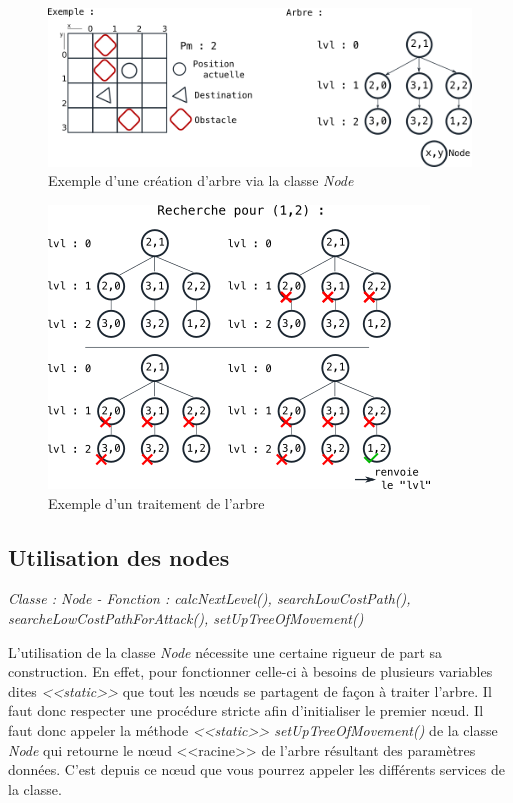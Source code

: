 \documentclass[a4paper, titlepage]{livret}
\begin{document}
          \begin{figure}[th]
          \begin{center}
            \includegraphics[scale=0.6]{Assets/treeExample.png}
            \caption{Exemple d'une création d'arbre via la classe \textit{Node}}
            \label{treeExample}
          \end{center}
        \end{figure}
            
        \begin{figure}[th]
          \begin{center}
            \includegraphics[scale=0.6]{Assets/parcourTree.png}
            \caption{Exemple d'un traitement de l'arbre}
            \label{parcourExample}
          \end{center}
        \end{figure}
        

      
        \subsection{Utilisation des nodes}
        \begin{center}
          \textit{Classe : Node - Fonction : calcNextLevel(), searchLowCostPath(), searcheLowCostPathForAttack(), setUpTreeOfMovement()}
        \end{center}
          L'utilisation de la classe \textit{Node} nécessite une certaine rigueur de part sa construction. En effet, pour fonctionner celle-ci à besoins de plusieurs variables dites \textit{<<static>>} que tout les nœuds se partagent de façon à traiter l'arbre. Il faut donc respecter une procédure stricte afin d'initialiser le premier nœud. Il faut donc appeler la méthode \textit{<<static>> setUpTreeOfMovement()} de la classe \textit{Node} qui retourne le nœud <<racine>> de l'arbre résultant des paramètres données. C'est depuis ce nœud que vous pourrez appeler les différents services de la classe.
        
\end{document}
